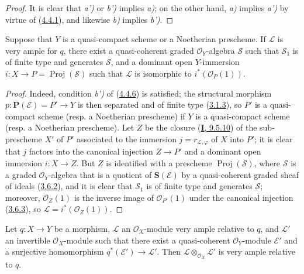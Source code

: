 \begin{proof}
It is clear that \emph{a')} or \emph{b')} implies \emph{a)}; on the other hand, \emph{a)} implies \emph{a')} by
virtue of (\hyperref[II.4.4.1]{4.4.1}), and likewise \emph{b)} implies \emph{b')}.
\end{proof}

\begin{corollary}[4.4.7]
\label{II.4.4.7}
Suppose that $Y$ is a quasi-compact scheme or a Noetherian prescheme. If
$\mathcal{L}$ is very ample for $q$, there exist a quasi-coherent graded
$\mathcal{O}_Y$-algebra $\mathcal{S}$ such that $\mathcal{S}_1$ is of finite
type and generates $\mathcal{S}$, and a \textup{dominant open} $Y$-immersion
$i:X\to P=\operatorname{Proj}(\mathcal{S})$ such that $\mathcal{L}$ is
isomorphic to $i^*(\mathcal{O}_P(1))$.
\end{corollary}

\begin{proof}
Indeed, condition \emph{b')} of (\hyperref[II.4.4.6]{4.4.6}) is satisfied;
the structural morphism $p:\mathbf{P}(\mathcal{E})=P'\to Y$ is then separated
and of finite type (\hyperref[II.3.1.3]{3.1.3}), so $P'$ is a
quasi-compact scheme (resp. a Noetherian prescheme) if $Y$ is a quasi-compact
scheme (resp. a Noetherian prescheme). Let $Z$ be the closure
(\hyperref[I.9.5.10]{\textbf{I}, 9.5.10}) of the sub-prescheme $X'$ of $P'$
associated to the immersion $j=r_{\mathcal{L},\varphi}$ of $X$ into $P'$; it
is clear that $j$ factors into the canonical injection $Z\to P'$ and a
dominant open immersion $i:X\to Z$. But $Z$ is identified with a prescheme
$\operatorname{Proj}(\mathcal{S})$, where $\mathcal{S}$ is a graded
$\mathcal{O}_Y$-algebra that is a quotient of $\mathbf{S}(\mathcal{E})$ by a
quasi-coherent graded sheaf of ideals
(\hyperref[II.3.6.2]{3.6.2}), and it is clear that $\mathcal{S}_1$ is of
finite type and generates $\mathcal{S}$; moreover, $\mathcal{O}_Z(1)$ is the
inverse image of $\mathcal{O}_{P'}(1)$ under the canonical injection
(\hyperref[II.3.6.3]{3.6.3}), so
$\mathcal{L}=i^*(\mathcal{O}_Z(1))$.
\end{proof}

\begin{proposition}[4.4.8]
\label{II.4.4.8}
Let $q:X\to Y$ be a morphism, $\mathcal{L}$ an $\mathcal{O}_X$-module very
ample relative to $q$, and $\mathcal{L}'$ an invertible $\mathcal{O}_X$-module
such that there exist a quasi-coherent $\mathcal{O}_Y$-module $\mathcal{E}'$
and a surjective homomorphism $q^*(\mathcal{E}')\to\mathcal{L}'$. Then
$\mathcal{L}\otimes_{\mathcal{O}_X}\mathcal{L}'$ is very ample relative
to $q$.
\end{proposition}

